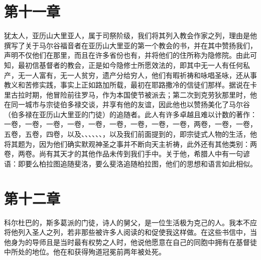 \section{第十一章}

犹太人，亚历山大里亚人，属于司祭阶级，我们将其列入教会作家之列，理由是他撰写了关于马尔谷福音者在亚历山大里亚的第一个教会的书，并在其中赞扬我们，声明不仅他们在那里，而且在许多省份也有，并将他们的住所称为隐修院。由此可知，最初信基督者的教会，正是如今隐修士所愿效法的，即其中无一人有任何私产，无一人富有，无一人贫穷，遗产分给穷人，他们有暇祈祷和咏唱圣咏，还从事教义和苦修实践，事实上正如路加所载，最初在耶路撒冷的信徒们那样。据说在卡里古拉时期，他冒险前往罗马，作为本国使节被派去；第二次到克劳狄那里时，他在同一城市与宗徒伯多禄交谈，并享有他的友谊，因此他也以赞扬美化了马尔谷（伯多禄在亚历山大里亚的门徒）的追随者。此人有许多卓越且难以计数的著作：一卷，一卷，一卷，一卷，一卷，一卷，一卷，一卷，一卷，两卷，一卷，一卷，五卷，五卷，四卷，以及、、、、、、，以及我们前面提到的，即宗徒式人物的生活，他将其题为，因为他们确实默观神圣之事并不断向天主祈祷，此外还有其他类别：两卷，两卷。尚有其天才的其他作品未传到我们手中。关于他，希腊人中有一句谚语：即要么柏拉图追随斐洛，要么斐洛追随柏拉图，他们的思想和语言如此相似。\par


\section{第十二章}

科尔杜巴的，斯多葛派的门徒，诗人的舅父，是一位生活极为克己的人。我本不应将他列入圣人之列，若非那些被许多人阅读的和促使我这样做。在这些书信中，当他身为的导师且是当时最有权势之人时，他说他愿意在自己的同胞中拥有在基督徒中所处的地位。他在和获得殉道冠冕前两年被处死。\par

